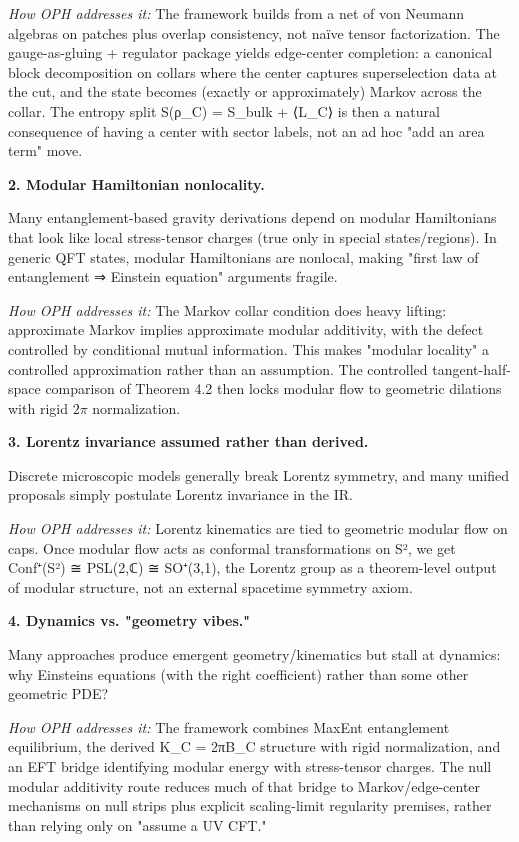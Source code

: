 \emph{How OPH addresses it:} The framework builds from a net of von Neumann algebras on patches plus overlap consistency, not na\"{i}ve tensor factorization. The gauge-as-gluing + regulator package yields edge-center completion: a canonical block decomposition on collars where the center captures superselection data at the cut, and the state becomes (exactly or approximately) Markov across the collar. The entropy split S(ρ\_C) = S\_bulk + ⟨L\_C⟩ is then a natural consequence of having a center with sector labels, not an ad hoc "add an area term" move.

\textbf{2. Modular Hamiltonian nonlocality.}

Many entanglement-based gravity derivations depend on modular Hamiltonians that look like local stress-tensor charges (true only in special states/regions). In generic QFT states, modular Hamiltonians are nonlocal, making "first law of entanglement ⇒ Einstein equation" arguments fragile.

\emph{How OPH addresses it:} The Markov collar condition does heavy lifting: approximate Markov implies approximate modular additivity, with the defect controlled by conditional mutual information. This makes "modular locality" a controlled approximation rather than an assumption. The controlled tangent-half-space comparison of Theorem 4.2 then locks modular flow to geometric dilations with rigid \(2\pi\) normalization.

\textbf{3. Lorentz invariance assumed rather than derived.}

Discrete microscopic models generally break Lorentz symmetry, and many unified proposals simply postulate Lorentz invariance in the IR.

\emph{How OPH addresses it:} Lorentz kinematics are tied to geometric modular flow on caps. Once modular flow acts as conformal transformations on S², we get Conf⁺(S²) ≅ PSL(2,ℂ) ≅ SO⁺(3,1), the Lorentz group as a theorem-level output of modular structure, not an external spacetime symmetry axiom.

\textbf{4. Dynamics vs. "geometry vibes."}

Many approaches produce emergent geometry/kinematics but stall at dynamics: why Einstein\textquotesingle s equations (with the right coefficient) rather than some other geometric PDE?

\emph{How OPH addresses it:} The framework combines MaxEnt entanglement equilibrium, the derived K\_C = 2πB\_C structure with rigid normalization, and an EFT bridge identifying modular energy with stress-tensor charges. The null modular additivity route reduces much of that bridge to Markov/edge-center mechanisms on null strips plus explicit scaling-limit regularity premises, rather than relying only on "assume a UV CFT."

